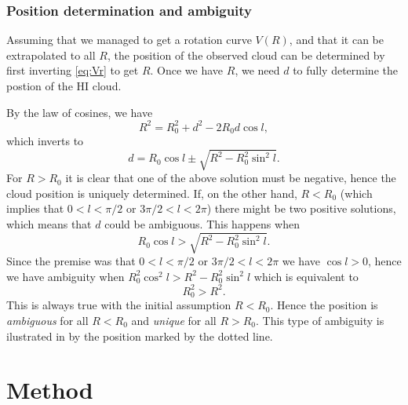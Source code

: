 \documentclass[11pt,a4paper, twocolumn,
swedish, english %
]{article}
\begin{document}
\subsubsection{Position determination and ambiguity}
Assuming that we managed to get a rotation curve $V(R)$, and that it
can be extrapolated to all $R$, the position of the observed cloud can
be determined by first inverting \eqref{eq:Vr} to get $R$. Once we
have $R$, we need $d$ to fully determine the postion of the HI
cloud.

By the law of cosines, we have
\begin{equation}
R^2=R_0^2+d^2-2R_0d\cos l,
\end{equation}
which inverts to
\begin{equation}\label{eq:d}
d=R_0\cos l \pm\sqrt{R^2-R_0^2\sin^2l}.
\end{equation}
For $R>R_0$ it is clear that one of the above solution must be
negative, hence the cloud position is uniquely determined.
If, on the other hand, $R<R_0$ (which implies that $0<l<\pi/2$ or
$3\pi/2<l<2\pi$) there might be two positive solutions, which means
that $d$ could be ambiguous. This happens when 
\begin{equation}
R_0\cos l>\sqrt{R^2-R_0^2\sin^2l}.
\end{equation}
Since the premise was that $0<l<\pi/2$ or $3\pi/2<l<2\pi$ we have
$\cos l>0$, hence we have ambiguity when
$R_0^2\cos^2l>R^2-R_0^2\sin^2l$ which is equivalent to
\begin{equation}
R_0^2>R^2.
\end{equation}
This is always true with the initial assumption $R<R_0$. Hence the
position is \emph{ambiguous} for all $R<R_0$ and \emph{unique} for all
$R>R_0$. This type of ambiguity is ilustrated in  by
the position marked by the dotted line.

\section{Method}

\end{document}
